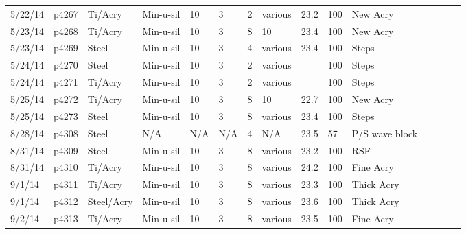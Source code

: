 \begin{landscape}
\begin{longtable} {lllllllllllllll}
5/22/14  & p4267      & Ti/Acry & Min-u-sil    & 10           & 3         & 2             & various                      & 23.2        & 100      & New Acry\\
5/23/14  & p4268      & Ti/Acry & Min-u-sil    & 10           & 3         & 8             & 10                           & 23.4        & 100      & New Acry\\
5/23/14  & p4269      & Steel            & Min-u-sil    & 10           & 3         & 4             & various                      & 23.4        & 100      & Steps\\
5/24/14  & p4270      & Steel            & Min-u-sil    & 10           & 3         & 2             & various                      &             & 100      & Steps\\
5/24/14  & p4271      & Ti/Acry & Min-u-sil    & 10           & 3         & 2             & various                      &             & 100      & Steps\\
5/25/14  & p4272      & Ti/Acry & Min-u-sil    & 10           & 3         & 8             & 10                           & 22.7        & 100      & New Acry\\
5/25/14  & p4273      & Steel            & Min-u-sil    & 10           & 3         & 8             & various                      & 23.4        & 100      & Steps\\
8/28/14  & p4308      & Steel            & N/A          & N/A          & N/A       & 4             & N/A                          & 23.5        & 57       & P/S wave block\\
8/31/14  & p4309      & Steel            & Min-u-sil    & 10           & 3         & 8             & various                      & 23.2        & 100      & RSF\\
8/31/14  & p4310      & Ti/Acry & Min-u-sil    & 10           & 3         & 8             & various                      & 24.2        & 100      & Fine Acry\\
9/1/14   & p4311      & Ti/Acry & Min-u-sil    & 10           & 3         & 8             & various                      & 23.3        & 100      & Thick Acry\\
9/1/14   & p4312      & Steel/Acry    & Min-u-sil    & 10           & 3         & 8             & various                      & 23.6        & 100      & Thick Acry\\
9/2/14   & p4313      & Ti/Acry & Min-u-sil    & 10           & 3         & 8             & various                      & 23.5        & 100      & Fine Acry\\

\end{longtable}
\end{landscape}
